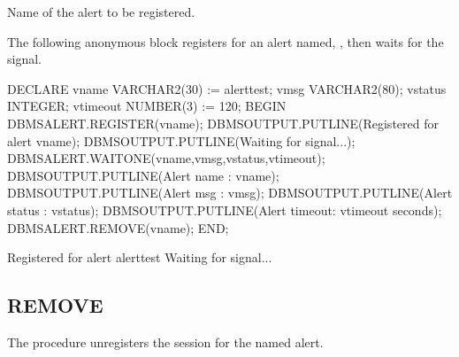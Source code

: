 \documentclass[letterpaper,10pt,english,openany,oneside]{sphinxmanual}
\begin{document}


Name of the alert to be registered.

\newpage


The following anonymous block registers for an alert named, , then waits for the signal.

%
\begin{sphinxVerbatim}[commandchars=\\\{\}]
DECLARE
   v\PYGZus{}name           VARCHAR2(30) := \PYGZsq{}alert\PYGZus{}test\PYGZsq{};
   v\PYGZus{}msg            VARCHAR2(80);
   v\PYGZus{}status         INTEGER;
   v\PYGZus{}timeout        NUMBER(3) := 120;
BEGIN
   DBMS\PYGZus{}ALERT.REGISTER(v\PYGZus{}name);
   DBMS\PYGZus{}OUTPUT.PUT\PYGZus{}LINE(\PYGZsq{}Registered for alert \PYGZsq{} \textbar{}\textbar{} v\PYGZus{}name);
   DBMS\PYGZus{}OUTPUT.PUT\PYGZus{}LINE(\PYGZsq{}Waiting for signal...\PYGZsq{});
   DBMS\PYGZus{}ALERT.WAITONE(v\PYGZus{}name,v\PYGZus{}msg,v\PYGZus{}status,v\PYGZus{}timeout);
   DBMS\PYGZus{}OUTPUT.PUT\PYGZus{}LINE(\PYGZsq{}Alert name   : \PYGZsq{} \textbar{}\textbar{} v\PYGZus{}name);
   DBMS\PYGZus{}OUTPUT.PUT\PYGZus{}LINE(\PYGZsq{}Alert msg    : \PYGZsq{} \textbar{}\textbar{} v\PYGZus{}msg);
   DBMS\PYGZus{}OUTPUT.PUT\PYGZus{}LINE(\PYGZsq{}Alert status : \PYGZsq{} \textbar{}\textbar{} v\PYGZus{}status);
   DBMS\PYGZus{}OUTPUT.PUT\PYGZus{}LINE(\PYGZsq{}Alert timeout: \PYGZsq{} \textbar{}\textbar{} v\PYGZus{}timeout \textbar{}\textbar{} \PYGZsq{} seconds\PYGZsq{});
   DBMS\PYGZus{}ALERT.REMOVE(v\PYGZus{}name);
END;

Registered for alert alert\PYGZus{}test
Waiting for signal...
\end{sphinxVerbatim}

\ignorespaces 

\subsection{REMOVE}
\label{\detokenize{dbms_alert:remove}}\label{\detokenize{dbms_alert:index-2}}
The  procedure unregisters the session for the named alert.


\end{document}
